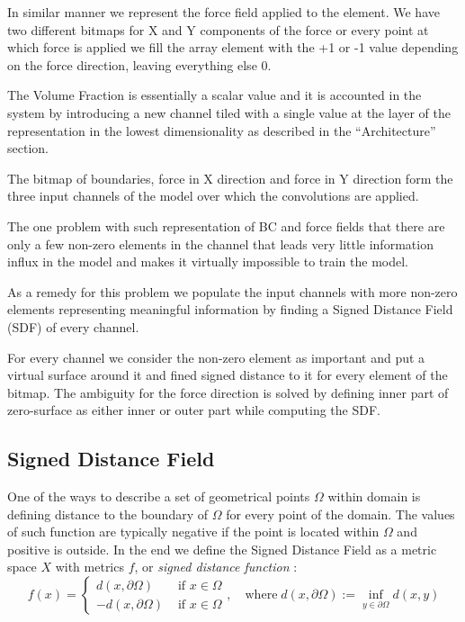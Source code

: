 In similar manner we represent the force field applied to the element.
We have two different bitmaps for {X} and {Y} components of the force or every point at which force is applied we fill the array element with the {+1} or {-1} value depending on the force direction, leaving everything else {0}.

The Volume Fraction is essentially a scalar value and it is accounted in the system by introducing a new channel tiled with a single value at the layer of the representation in the lowest dimensionality as described in the ``Architecture'' section.

The bitmap of boundaries, force in X direction and force in Y direction form the three input channels of the model over which the convolutions are applied.

The one problem with such representation of BC and force fields that there are only a few non-zero elements in the channel that leads very little information influx in the model and makes it virtually impossible to train the model.

As a remedy for this problem we populate the input channels with more non-zero elements representing meaningful information by finding a Signed Distance Field (SDF) of every channel.

For every channel we consider the non-zero element as important and put a virtual surface around it and fined signed distance to it for every element of the bitmap.
The ambiguity for the force direction is solved by defining inner part of zero-surface as either inner or outer part while computing the SDF.

\subsection{Signed Distance Field}

One of the ways to describe a set of geometrical points $\Omega$ within domain is defining distance to the boundary of $\Omega$ for every point of the domain. 
The values of such function are typically negative if the point is located within $\Omega$ and positive is outside.
In the end we define the Signed Distance Field as a metric space $X$ with metrics $f$, or \textit{signed distance function} :    
\[ 
f(x) = 
	\begin{cases}
			d(x, \partial \Omega) & \mbox{ if } x\in\Omega  \\
			-d(x, \partial \Omega) & \mbox{ if } x\in\Omega 
	\end{cases} 
	, \quad \mathrm{where} \; d(x, \partial \Omega) := \inf_{y \in \partial \Omega}d(x, y)
\]

